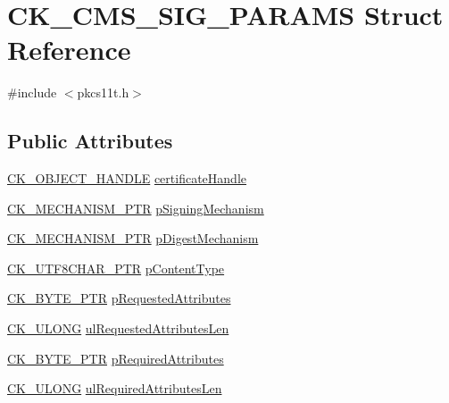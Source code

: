 \hypertarget{struct_c_k___c_m_s___s_i_g___p_a_r_a_m_s}{}\section{C\+K\+\_\+\+C\+M\+S\+\_\+\+S\+I\+G\+\_\+\+P\+A\+R\+A\+MS Struct Reference}
\label{struct_c_k___c_m_s___s_i_g___p_a_r_a_m_s}


{\ttfamily \#include $<$pkcs11t.\+h$>$}

\subsection*{Public Attributes}
\begin{DoxyCompactItemize}
\item 
\hyperlink{pkcs11t_8h_ad1cdd703196214cd34e6f9f52bc67683}{C\+K\+\_\+\+O\+B\+J\+E\+C\+T\+\_\+\+H\+A\+N\+D\+LE} \hyperlink{struct_c_k___c_m_s___s_i_g___p_a_r_a_m_s_af159e64a054b24fafda6eb8187d5177c}{certificate\+Handle}
\item 
\hyperlink{pkcs11t_8h_afa4c48ba8a588833ea04f0910583592e}{C\+K\+\_\+\+M\+E\+C\+H\+A\+N\+I\+S\+M\+\_\+\+P\+TR} \hyperlink{struct_c_k___c_m_s___s_i_g___p_a_r_a_m_s_a1b49871315d18fd726c6871cd971236c}{p\+Signing\+Mechanism}
\item 
\hyperlink{pkcs11t_8h_afa4c48ba8a588833ea04f0910583592e}{C\+K\+\_\+\+M\+E\+C\+H\+A\+N\+I\+S\+M\+\_\+\+P\+TR} \hyperlink{struct_c_k___c_m_s___s_i_g___p_a_r_a_m_s_a63ba4f2d4e7be8d102e93a286a1d7877}{p\+Digest\+Mechanism}
\item 
\hyperlink{pkcs11t_8h_af25c3841a3f605e6414f4c9ef5592ed9}{C\+K\+\_\+\+U\+T\+F8\+C\+H\+A\+R\+\_\+\+P\+TR} \hyperlink{struct_c_k___c_m_s___s_i_g___p_a_r_a_m_s_a677aa9778cdf65f7ddd4ce4d687bb2dd}{p\+Content\+Type}
\item 
\hyperlink{pkcs11t_8h_a3d7233a4077fbaf7ae76b64da0a62a21}{C\+K\+\_\+\+B\+Y\+T\+E\+\_\+\+P\+TR} \hyperlink{struct_c_k___c_m_s___s_i_g___p_a_r_a_m_s_a3e8777dbb5a643832e3af176b148b8e0}{p\+Requested\+Attributes}
\item 
\hyperlink{pkcs11t_8h_a35181858a3b7a0a81f49d180d8f446ef}{C\+K\+\_\+\+U\+L\+O\+NG} \hyperlink{struct_c_k___c_m_s___s_i_g___p_a_r_a_m_s_af6078bfc01a13e7ae2556fb806000a4f}{ul\+Requested\+Attributes\+Len}
\item 
\hyperlink{pkcs11t_8h_a3d7233a4077fbaf7ae76b64da0a62a21}{C\+K\+\_\+\+B\+Y\+T\+E\+\_\+\+P\+TR} \hyperlink{struct_c_k___c_m_s___s_i_g___p_a_r_a_m_s_ab1e315c86bada47d945738b351936ca9}{p\+Required\+Attributes}
\item 
\hyperlink{pkcs11t_8h_a35181858a3b7a0a81f49d180d8f446ef}{C\+K\+\_\+\+U\+L\+O\+NG} \hyperlink{struct_c_k___c_m_s___s_i_g___p_a_r_a_m_s_a0849e6c4b7613787007c2b657f77810a}{ul\+Required\+Attributes\+Len}
\end{DoxyCompactItemize}


